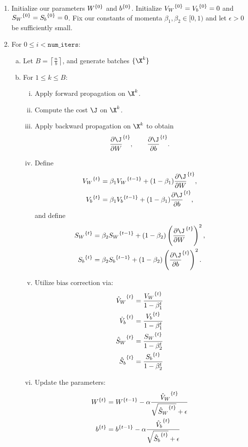 \begin{enumerate}
	\item Initialize our parameters ${W}^{\{{0}\}}$ and ${b}^{\{{0}\}}$.  Initialize ${V_W}^{\{{0}\}}={V_b}^{\{{0}\}}=0$ and ${S_W}^{\{{0}\}}={S_b}^{\{{0}\}}=0$.  Fix our constants of momenta $\beta_1,\beta_2\in[0,1)$ and let $\epsilon>0$ be sufficiently small.
	\item For $0\leq i <\texttt{num\_iters}$:
	\begin{enumerate}[a.]
		\item Let $B=\left\lceil\frac{n}{b}\right\rceil$, and generate batches $\{\X^k\}$
		\item For $1\leq k\leq B$:
		\begin{enumerate}[i.]
			\item Apply forward propagation on $\X^k$.
			\item Compute the cost $\J$ on $\X^k$.
			\item Apply backward propagation on $\X^k$ to obtain
			$$\iter{\frac{\partial\J}{\partial W}}{t},\qquad \iter{\frac{\partial\J}{\partial b}}{t}.$$
			\item Define
			\begin{align*}
				\iter{V_W}{t}&=\beta_1\iter{V_W}{t-1}+(1-\beta_1)\iter{\frac{\partial\J}{\partial W}}{t},\\
				\iter{V_b}{t}&=\beta_1\iter{V_b}{t-1}+(1-\beta_1)\iter{\frac{\partial\J}{\partial b}}{t},
			\end{align*}
			and define
			\begin{align*}
				\iter{S_W}{t}&=\beta_2\iter{S_W}{t-1}+(1-\beta_2)\left(\iter{\frac{\partial\J}{\partial W}}{t}\right)^2,\\
				\iter{S_b}{t}&=\beta_2\iter{S_b}{t-1}+(1-\beta_2)\left(\iter{\frac{\partial\J}{\partial b}}{t}\right)^2.
			\end{align*}
			\item Utilize bias correction via:
			\begin{align*}
				{\hat{V}_W}^{\{{t}\}}&=\frac{{V_W}^{\{{t}\}}}{1-\beta_1^t}\\
				{\hat{V}_b}^{\{{t}\}}&=\frac{{V_b}^{\{{t}\}}}{1-\beta_1^t}\\
				{\hat{S}_W}^{\{{t}\}}&=\frac{{S_W}^{\{{t}\}}}{1-\beta_2^t}\\
				{\hat{S}_b}^{\{{t}\}}&=\frac{{S_b}^{\{{t}\}}}{1-\beta_2^t}
			\end{align*}
			\item Update the parameters:
			\begin{align*}
				{W}^{\{{t}\}}&={W}^{\{{t-1}\}}-\alpha\frac{{\hat{V}_W}^{\{{t}\}}}{\sqrt{{\hat{S}_W}^{\{{t}\}}}+\epsilon}\\
				{b}^{\{{t}\}}&={b}^{\{{t-1}\}}-\alpha\frac{{\hat{V}_b}^{\{{t}\}}}{\sqrt{{\hat{S}_b}^{\{{t}\}}}+\epsilon}
			\end{align*}
		\end{enumerate}
	\end{enumerate}
\end{enumerate}

